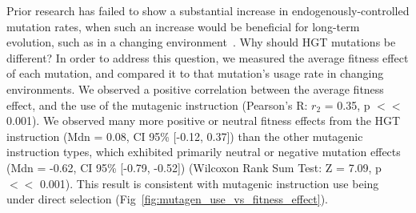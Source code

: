 \documentclass[PhD]{msu-thesis}
\begin{document}
Prior research has failed to show a substantial increase in endogenously-controlled mutation rates, when such an increase would be beneficial for long-term evolution, such as in a changing environment~\cite{clune_natural_2008}.
Why should HGT mutations be different? In order to address this question, we measured the average fitness effect of each mutation, and compared it to that mutation's usage rate in changing environments. We observed a positive correlation between the average fitness effect, and the use of the mutagenic instruction (Pearson's R: $r_{2}$ = 0.35, p $<<$ 0.001). We observed many more positive or neutral fitness effects from the HGT instruction (Mdn = 0.08, CI 95\% [-0.12, 0.37]) than the other mutagenic instruction types, which exhibited primarily neutral or negative mutation effects (Mdn = -0.62, CI 95\% [-0.79, -0.52]) (Wilcoxon Rank Sum Test: Z = 7.09, p $<<$ 0.001). This result is consistent with mutagenic instruction use being under direct selection (Fig~\ref{fig:mutagen_use_vs_fitness_effect}).

\end{document}
